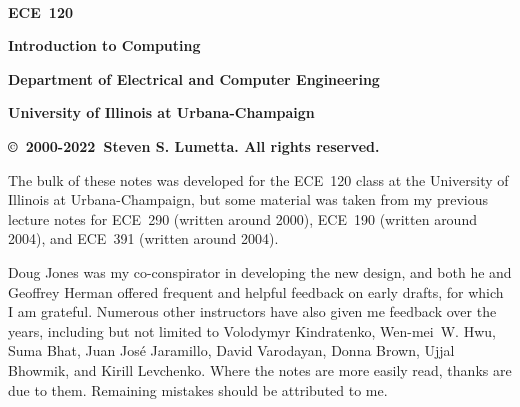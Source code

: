 \newcommand{\myyear}{2000-2022}


\newcommand{\twovert}[2]{\mbox{\arraycolsep 0pt \tabcolsep 0pt \begin{tabular}{c}{#1}\\{#2}\end{tabular}}}
\newcommand{\threevert}[3]{\mbox{\arraycolsep 0pt \tabcolsep 0pt \begin{tabular}{c}{#1}\\{#2}\\{#3}\end{tabular}}}
\newcommand{\fourvert}[4]{\mbox{\arraycolsep 0pt \tabcolsep 0pt \begin{tabular}{c}{#1}\\{#2}\\{#3}\\{#4}\end{tabular}}}
\newcommand{\fivevert}[5]{\mbox{\arraycolsep 0pt \tabcolsep 0pt \begin{tabular}{c}{#1}\\{#2}\\{#3}\\{#4}\\{#5}\end{tabular}}}



\thispagestyle{empty}


\mbox{~~~}\vspace{3in}

\centerline{\Huge \bf ECE~120}
\vspace{20pt}
\centerline{\huge \bf Introduction to Computing}
\vspace{30pt}
\centerline{\LARGE \bf Department of Electrical and Computer Engineering}
\vspace{10pt}
\centerline{\LARGE \bf University of Illinois at Urbana-Champaign}
\vspace{10pt}
\centerline{\Large \bf \copyright~\myyear~Steven S. Lumetta.  All rights reserved.}
\vfill\vfill

\pagebreak

The bulk of these notes was developed for the ECE~120 class at the
University of Illinois at Urbana-Champaign, but some material was taken
from my previous lecture notes for 
ECE~290 (written around 2000),
ECE~190 (written around 2004), and 
ECE~391 (written around 2004).

Doug Jones was my co-conspirator in developing the new design, and both 
he and Geoffrey Herman offered frequent and helpful feedback on early 
drafts, for which I am grateful.  Numerous other instructors have also
given me feedback over the years, including but not limited to 
%
Volodymyr Kindratenko,
Wen-mei~W. Hwu,
Suma Bhat,
Juan Jos\'e Jaramillo,
David Varodayan,
Donna Brown,
Ujjal Bhowmik,
and
Kirill Levchenko.
%
Where the notes are more easily read, thanks are due to them.  Remaining
mistakes should be attributed to me.


